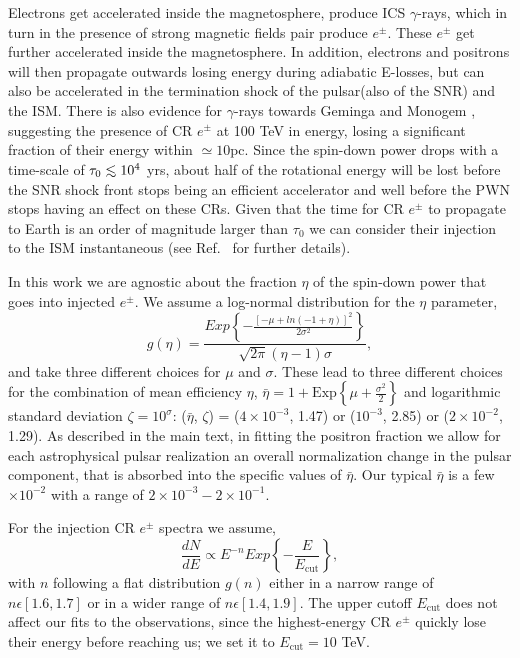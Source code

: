 \documentclass[aps,prd,twocolumn,amsmath,superscriptaddress,amssymb,showpacs,floatfix,nofootinbib]{revtex4-1}
\def\lsim{\mathrel{\raise.3ex\hbox{$<$\kern-.75em\lower1ex\hbox{$\sim$}}}}
\begin{document}
\begin{appendix}
Electrons get accelerated inside the magnetosphere, produce ICS $\gamma$-rays, which in turn
in the presence of strong magnetic fields pair produce $e^{\pm}$. These $e^{\pm}$ get further accelerated inside 
the magnetosphere. In addition, electrons and positrons will then propagate outwards losing energy during
 adiabatic E-losses, but can also be accelerated in the termination shock of the pulsar(also of the SNR) and the
  ISM. 
  There is also evidence for $\gamma$-rays towards Geminga and Monogem  \cite{Abdo:2009ku, Abeysekara:2017hyn, Abeysekara:2017old},
  suggesting the presence of CR $e^{\pm}$ at 100 TeV in energy, losing a significant fraction of their energy 
  within $\simeq 10$pc. 
  Since the spin-down power drops with a time-scale of $\tau_{0} \lsim 10^{4}$ yrs, about half of the rotational
   energy will be lost before the SNR shock front stops being an efficient accelerator and well before the PWN stops
having an effect on these CRs. Given that the time for CR
$e^{\pm}$ to propagate to Earth is an order of magnitude larger
than $\tau_{0}$ we can consider their injection to the ISM
instantaneous (see Ref.~\cite{Malyshev:2009tw} for further details). 

In this work we are agnostic about the fraction $\eta$ of the spin-down power that goes into injected $e^{\pm}$.
We assume a log-normal distribution for the $\eta$ parameter, 
\begin{equation}
g(\eta) = \frac{Exp \left\{ -\frac{ \left[ - \mu +ln(-1 + \eta) \right]^{2}}{2 \sigma^2}\right\}}{\sqrt{2 \pi} (\eta -1) \sigma},
\label{eq:eta}
\end{equation}
and take three different choices for $\mu$ and $\sigma$.
These lead to three different choices for the combination of mean efficiency 
$\eta$, $\bar{\eta} = 1 + \textrm{Exp}\left\{ \mu + \frac{\sigma^2}{2} \right\}$ and logarithmic standard deviation  
$\zeta = 10^{\sigma}$: ($\bar{\eta}$, $\zeta$)  = ($4\times 10^{-3}$, 1.47) or ($10^{-3}$, 2.85) or 
($2\times 10^{-2}$, 1.29). As described in the main text, in fitting the positron fraction we allow for each 
astrophysical pulsar realization an overall normalization change in the pulsar component, that is absorbed 
into the specific values of $\bar{\eta}$. Our typical $\bar{\eta}$ is a few$\times 10^{-2}$ with a range of $2\times10^{-3} - 2\times10^{-1}$.

For the injection CR $e^{\pm}$ spectra we assume,
\begin{equation}
\frac{dN}{dE} \propto  E^{-n} Exp \left\{ -\frac{E}{E_{\textrm{cut}}}\right\},
\label{eq:InjSpect}
\end{equation}
with $n$ following a flat distribution $g(n)$ either in a narrow
range of $n \epsilon \left[1.6,1.7\right]$ or in a wider range
of $n \epsilon \left[1.4,1.9\right]$. The upper cutoff
$E_{\textrm{cut}}$ does not affect our fits to the observations,
since the highest-energy CR $e^{\pm}$ quickly lose their
energy before reaching us; we set it to $E_{\textrm{cut}} = 10$
TeV.


\end{appendix}
\end{document}
